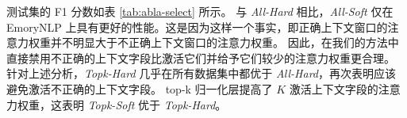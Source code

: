 测试集的 F1 分数如表 \ref{tab:abla-select} 所示。 与 \textit{All-Hard} 相比，\textit{All-Soft} 仅在 EmoryNLP 上具有更好的性能。这是因为这样一个事实，即正确上下文窗口的注意力权重并不明显大于不正确上下文窗口的注意力权重。 因此，在我们的方法中直接禁用不正确的上下文字段比激活它们并给予它们较少的注意力权重更合理。 针对上述分析，\textit{Topk-Hard} 几乎在所有数据集中都优于 \textit{All-Hard}，再次表明应该避免激活不正确的上下文字段。 top-k 归一化层提高了 $K$ 激活上下文字段的注意力权重，这表明 \textit{Topk-Soft} 优于 \textit{Topk-Hard}。
\begin{table}[ht]
\small
\centering
\caption{三个数据集测试集上上下文窗口分布生成方法的消融结果。}
\label{tab:abla-select}
\end{table}

